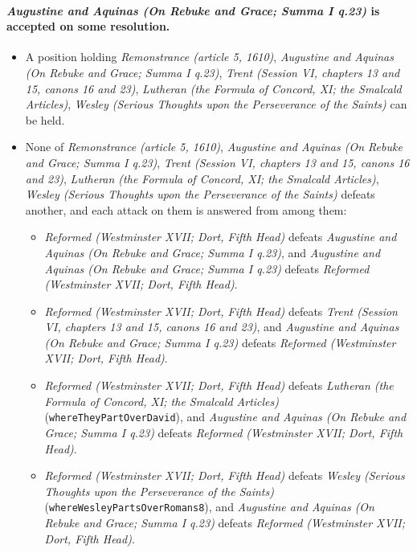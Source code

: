 \documentclass[11pt]{article}
\begin{document}
\paragraph{\emph{Augustine and Aquinas (On Rebuke and Grace; Summa I q.23)} is accepted on some resolution.}
\begin{itemize}
\item A position holding \emph{Remonstrance (article 5, 1610)}, \emph{Augustine and Aquinas (On Rebuke and Grace; Summa I q.23)}, \emph{Trent (Session VI, chapters 13 and 15, canons 16 and 23)}, \emph{Lutheran (the Formula of Concord, XI; the Smalcald Articles)}, \emph{Wesley (Serious Thoughts upon the Perseverance of the Saints)} can be held.
\item None of \emph{Remonstrance (article 5, 1610)}, \emph{Augustine and Aquinas (On Rebuke and Grace; Summa I q.23)}, \emph{Trent (Session VI, chapters 13 and 15, canons 16 and 23)}, \emph{Lutheran (the Formula of Concord, XI; the Smalcald Articles)}, \emph{Wesley (Serious Thoughts upon the Perseverance of the Saints)} defeats another, and each attack on them is answered from among them:
\begin{itemize}
\item \emph{Reformed (Westminster XVII; Dort, Fifth Head)} defeats \emph{Augustine and Aquinas (On Rebuke and Grace; Summa I q.23)}, and \emph{Augustine and Aquinas (On Rebuke and Grace; Summa I q.23)} defeats \emph{Reformed (Westminster XVII; Dort, Fifth Head)}.
\item \emph{Reformed (Westminster XVII; Dort, Fifth Head)} defeats \emph{Trent (Session VI, chapters 13 and 15, canons 16 and 23)}, and \emph{Augustine and Aquinas (On Rebuke and Grace; Summa I q.23)} defeats \emph{Reformed (Westminster XVII; Dort, Fifth Head)}.
\item \emph{Reformed (Westminster XVII; Dort, Fifth Head)} defeats \emph{Lutheran (the Formula of Concord, XI; the Smalcald Articles)} (\texttt{where\allowbreak{}They\allowbreak{}Part\allowbreak{}Over\allowbreak{}David}), and \emph{Augustine and Aquinas (On Rebuke and Grace; Summa I q.23)} defeats \emph{Reformed (Westminster XVII; Dort, Fifth Head)}.
\item \emph{Reformed (Westminster XVII; Dort, Fifth Head)} defeats \emph{Wesley (Serious Thoughts upon the Perseverance of the Saints)} (\texttt{where\allowbreak{}Wesley\allowbreak{}Parts\allowbreak{}Over\allowbreak{}Romans8}), and \emph{Augustine and Aquinas (On Rebuke and Grace; Summa I q.23)} defeats \emph{Reformed (Westminster XVII; Dort, Fifth Head)}.
\end{itemize}
\end{itemize}
\end{document}
